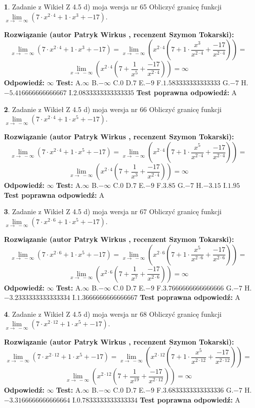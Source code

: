 \documentclass[12pt, a4paper]{article}
\theoremstyle{definition} %
\newtheorem{zad}{}
\newcommand{\zadStart}[1]{\begin{zad}#1\newline}
\newcommand{\zadStop}{\end{zad}}
\newcommand{\rozwStart}[2]{\noindent \textbf{Rozwiązanie (autor #1 , recenzent #2): }\newline}
\newcommand{\rozwStop}{\newline}
\newcommand{\odpStart}{\noindent \textbf{Odpowiedź:}\newline}
\newcommand{\odpStop}{\newline}
\newcommand{\testStart}{\noindent \textbf{Test:}\newline}
\newcommand{\testStop}{\newline}
\newcommand{\kluczStart}{\noindent \textbf{Test poprawna odpowiedź:}\newline}
\newcommand{\kluczStop}{\newline}
\begin{document}
\zadStart{Zadanie z Wikieł Z 4.5 d) moja wersja nr 65}
Obliczyć granicę funkcji  $\lim\limits_{x\to\ -\infty}(7 \cdot x^{2\cdot4}+1 \cdot x^{3}+-17)$.
\zadStop
\rozwStart{Patryk Wirkus}{Szymon Tokarski}
$$\lim\limits_{x\to\ -\infty}(7 \cdot x^{2\cdot4}+1 \cdot x^{3}+-17) = \lim\limits_{x\to\ -\infty}(x^{2\cdot4}(7 +1 \cdot \frac{x^{3}}{x^{2\cdot4}}+\frac{-17}{x^{2\cdot4}})) =$$ $$\lim\limits_{x\to\ -\infty}(x^{2\cdot4}(7 +\frac{1}{x^{5}}+\frac{-17}{x^{2\cdot4}})) =\infty$$
\rozwStop
\odpStart
$\infty$
\odpStop
\testStart
A.$\infty$ B.$-\infty$ C.$0$ D.$7$ E.$-9$
F.$1.583333333333333$ G.$-7$
H.$-5.416666666666667$
I.$2.0833333333333335$
\testStop
\kluczStart
A
\kluczStop



\zadStart{Zadanie z Wikieł Z 4.5 d) moja wersja nr 66}
Obliczyć granicę funkcji  $\lim\limits_{x\to\ -\infty}(7 \cdot x^{2\cdot4}+1 \cdot x^{5}+-17)$.
\zadStop
\rozwStart{Patryk Wirkus}{Szymon Tokarski}
$$\lim\limits_{x\to\ -\infty}(7 \cdot x^{2\cdot4}+1 \cdot x^{5}+-17) = \lim\limits_{x\to\ -\infty}(x^{2\cdot4}(7 +1 \cdot \frac{x^{5}}{x^{2\cdot4}}+\frac{-17}{x^{2\cdot4}})) =$$ $$\lim\limits_{x\to\ -\infty}(x^{2\cdot4}(7 +\frac{1}{x^{3}}+\frac{-17}{x^{2\cdot4}})) =\infty$$
\rozwStop
\odpStart
$\infty$
\odpStop
\testStart
A.$\infty$ B.$-\infty$ C.$0$ D.$7$ E.$-9$
F.$3.85$ G.$-7$
H.$-3.15$
I.$1.95$
\testStop
\kluczStart
A
\kluczStop



\zadStart{Zadanie z Wikieł Z 4.5 d) moja wersja nr 67}
Obliczyć granicę funkcji  $\lim\limits_{x\to\ -\infty}(7 \cdot x^{2\cdot6}+1 \cdot x^{5}+-17)$.
\zadStop
\rozwStart{Patryk Wirkus}{Szymon Tokarski}
$$\lim\limits_{x\to\ -\infty}(7 \cdot x^{2\cdot6}+1 \cdot x^{5}+-17) = \lim\limits_{x\to\ -\infty}(x^{2\cdot6}(7 +1 \cdot \frac{x^{5}}{x^{2\cdot6}}+\frac{-17}{x^{2\cdot6}})) =$$ $$\lim\limits_{x\to\ -\infty}(x^{2\cdot6}(7 +\frac{1}{x^{7}}+\frac{-17}{x^{2\cdot6}})) =\infty$$
\rozwStop
\odpStart
$\infty$
\odpStop
\testStart
A.$\infty$ B.$-\infty$ C.$0$ D.$7$ E.$-9$
F.$3.7666666666666666$ G.$-7$
H.$-3.2333333333333334$
I.$1.3666666666666667$
\testStop
\kluczStart
A
\kluczStop



\zadStart{Zadanie z Wikieł Z 4.5 d) moja wersja nr 68}
Obliczyć granicę funkcji  $\lim\limits_{x\to\ -\infty}(7 \cdot x^{2\cdot12}+1 \cdot x^{5}+-17)$.
\zadStop
\rozwStart{Patryk Wirkus}{Szymon Tokarski}
$$\lim\limits_{x\to\ -\infty}(7 \cdot x^{2\cdot12}+1 \cdot x^{5}+-17) = \lim\limits_{x\to\ -\infty}(x^{2\cdot12}(7 +1 \cdot \frac{x^{5}}{x^{2\cdot12}}+\frac{-17}{x^{2\cdot12}})) =$$ $$\lim\limits_{x\to\ -\infty}(x^{2\cdot12}(7 +\frac{1}{x^{19}}+\frac{-17}{x^{2\cdot12}})) =\infty$$
\rozwStop
\odpStart
$\infty$
\odpStop
\testStart
A.$\infty$ B.$-\infty$ C.$0$ D.$7$ E.$-9$
F.$3.6833333333333336$ G.$-7$
H.$-3.3166666666666664$
I.$0.7833333333333334$
\testStop
\kluczStart
A
\kluczStop
\end{document}
